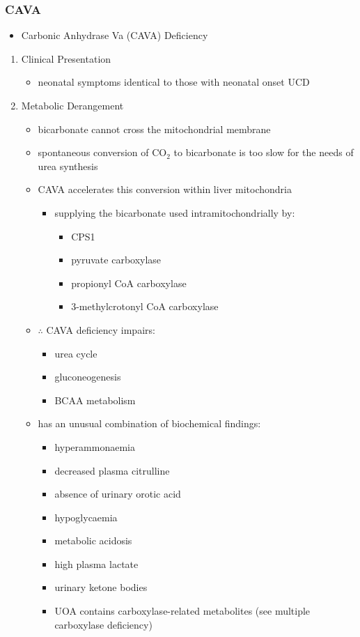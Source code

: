\documentclass{scrartcl}
\begin{document}
\subsubsection{CAVA}
\label{sec:org7e1d6c7}
\begin{itemize}
\item Carbonic Anhydrase Va (CAVA) Deficiency
\end{itemize}
\begin{enumerate}
\item Clinical Presentation
\label{sec:org6a5c384}
\begin{itemize}
\item neonatal symptoms identical to those with neonatal onset UCD
\end{itemize}
\item Metabolic Derangement
\label{sec:org45babde}
\begin{itemize}
\item bicarbonate cannot cross the mitochondrial membrane
\item spontaneous conversion of CO\(_{\text{2}}\) to bicarbonate is too slow for the
needs of urea synthesis
\item CAVA accelerates this conversion within liver mitochondria
\begin{itemize}
\item supplying the bicarbonate used intramitochondrially by:
\begin{itemize}
\item CPS1
\item pyruvate carboxylase
\item propionyl CoA carboxylase
\item 3-methylcrotonyl CoA carboxylase
\end{itemize}
\end{itemize}
\item \(\therefore\) CAVA deficiency impairs:
\begin{itemize}
\item urea cycle
\item gluconeogenesis
\item BCAA metabolism
\end{itemize}
\item has an unusual combination of biochemical findings:
\begin{itemize}
\item hyperammonaemia
\item decreased plasma citrulline
\item absence of urinary orotic acid
\item hypoglycaemia
\item metabolic acidosis
\item high plasma lactate
\item urinary ketone bodies
\item UOA contains carboxylase-related metabolites (see multiple carboxylase deficiency)
\end{itemize}
\end{itemize}


\end{enumerate}
\end{document}
